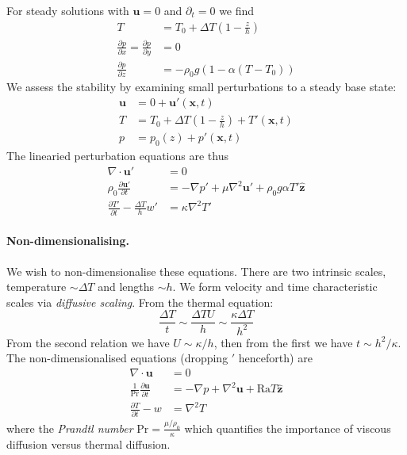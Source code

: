 \documentclass{jknotes}
\begin{document}
For steady solutions with $\symbf{u} = 0$ and $\partial_t = 0$ we find
\begin{align}
	T &= T_0 + \Delta T \left(1-\frac{z}{h}\right) \\
	\frac{\partial p}{\partial x} = \frac{\partial p}{\partial y} &= 0 \\
	\frac{\partial p}{\partial z} &= - \rho_0 g \left( 1- \alpha
	(T-T_0)\right) 
\end{align}
We assess the stability by examining small perturbations to a steady base
state:
\begin{align}
	\symbf{u} &= 0 + \symbf{u}'(\symbf{x},t) \\
	T &= T_0 + \Delta T \left(1-\frac{z}{h}\right) + T'(\symbf{x},t) \\
	p &= p_0(z) + p'(\symbf{x},t) 
\end{align}
The linearied perturbation equations are thus
\begin{align}
	\nabla \cdot \symbf{u}' &= 0  \\
	\rho_0  \frac{\partial \symbf{u}'}{\partial t} &= - \nabla p' + \mu
	\nabla^2 \symbf{u}' + \rho_0 g \alpha T' \hat{\symbf{z}} \\
	\frac{\partial T'}{\partial t} - \frac{\Delta T}{h} w' &= \kappa \nabla^2
	T'
\end{align}

\paragraph{Non-dimensionalising.}
We wish to non-dimensionalise these equations. There are two intrinsic
scales, temperature $\sim \Delta T$ and lengths $\sim h$. We form velocity and
time characteristic scales via \emph{diffusive scaling}. From the thermal
equation:
\begin{equation}
	\frac{\Delta T}{t} \sim \frac{\Delta T U}{h} \sim \frac{\kappa \Delta
	T}{h^2}
\end{equation}
From the second relation we have $U \sim \kappa/h$, then from the first we
have $t \sim h^2/\kappa$.  The non-dimensionalised equations (dropping $'$
henceforth) are
\begin{align}
	\nabla \cdot \symbf{u} &= 0 \label{eq:L2:1}\\
	\frac{1}{\text{Pr}} \frac{\partial \symbf{u}}{\partial t} &= - \nabla p +
	\nabla^2 \symbf{u} + \text{Ra}T \hat{\symbf{z}} \label{eq:L2:2}\\
	\frac{\partial T}{\partial  t} - w &= \nabla^2 T  \label{eq:L2:3}
\end{align}
where the \emph{Prandtl number} $\text{Pr} = \frac{\mu/\rho_0}{\kappa}$ which
quantifies the importance of viscous diffusion versus thermal diffusion.
\end{document}
